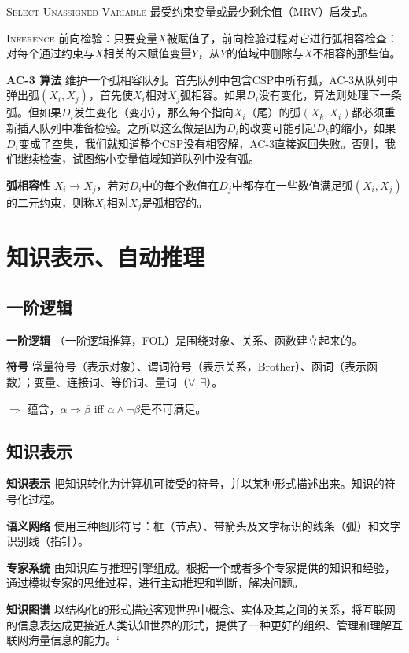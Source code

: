 \documentclass[10pt,a4paper]{ctexart}
\begin{document}
\begin{multicols}{3}
        \textsc{Select-Unassigned-Variable} 最受约束变量或最少剩余值（MRV）启发式。

        \textsc{Inference} 前向检验：只要变量$X$被赋值了，前向检验过程对它进行弧相容检查：对每个通过约束与$X$相关的未赋值变量$Y$，从$Y$的值域中删除与$X$不相容的那些值。

        \textbf{AC-3 算法}
        维护一个弧相容队列。首先队列中包含CSP中所有弧，AC-3从队列中弹出弧$(X_i,X_j)$，首先使$X_i$相对$X_j$弧相容。如果$D_i$没有变化，算法则处理下一条弧。但如果$D_i$发生变化（变小），那么每个指向$X_i$（尾）的弧$(X_k,X_i)$都必须重新插入队列中准备检验。之所以这么做是因为$D_i$的改变可能引起$D_k$的缩小，如果$D_i$变成了空集，我们就知道整个CSP没有相容解，AC-3直接返回失败。否则，我们继续检查，试图缩小变量值域知道队列中没有弧。

        \textbf{弧相容性}
        $X_i\rightarrow X_j$，若对$D_i$中的每个数值在$D_j$中都存在一些数值满足弧$(X_i,X_j)$的二元约束，则称$X_i$相对$X_j$是弧相容的。

        \section{知识表示、自动推理}
        \subsection{一阶逻辑}
        \textbf{一阶逻辑}
        （一阶逻辑推算，FOL）是围绕对象、关系、函数建立起来的。

        \textbf{符号}
        常量符号（表示对象）、谓词符号（表示关系，Brother）、函词（表示函数）；变量、连接词、等价词、量词（$\forall,\exists$）。

        $\Rightarrow$
        蕴含，$\alpha\Rightarrow\beta$ iff $\alpha\land\neg\beta$是不可满足。

        \subsection{知识表示}
        \textbf{知识表示}
        把知识转化为计算机可接受的符号，并以某种形式描述出来。知识的符号化过程。

        \textbf{语义网络}
        使用三种图形符号：框（节点）、带箭头及文字标识的线条（弧）和文字识别线（指针）。

        \textbf{专家系统}
        由知识库与推理引擎组成。根据一个或者多个专家提供的知识和经验，通过模拟专家的思维过程，进行主动推理和判断，解决问题。

        \textbf{知识图谱}
        以结构化的形式描述客观世界中概念、实体及其之间的关系，将互联网的信息表达成更接近人类认知世界的形式，提供了一种更好的组织、管理和理解互联网海量信息的能力。‘


\end{multicols}
\end{document}

